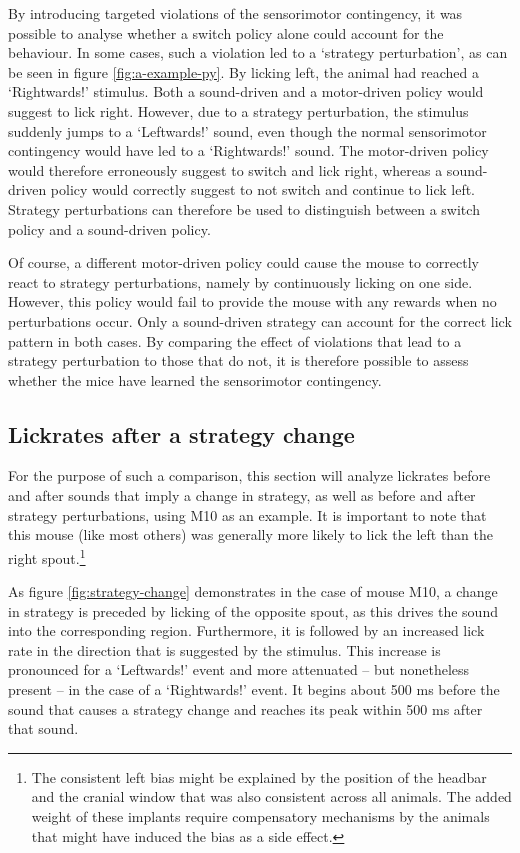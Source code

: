\documentclass[]{report}
\let\rmarkdownfootnote\footnote%
\def\footnote{\protect\rmarkdownfootnote}
\theoremstyle{definition}
\theoremstyle{definition}
\theoremstyle{definition}
\theoremstyle{remark}
\begin{document}
By introducing targeted violations of the sensorimotor contingency, it
was possible to analyse whether a switch policy alone could account for
the behaviour. In some cases, such a violation led to a `strategy
perturbation', as can be seen in figure \ref{fig:a-example-py}. By
licking left, the animal had reached a `Rightwards!' stimulus. Both a
sound-driven and a motor-driven policy would suggest to lick right.
However, due to a strategy perturbation, the stimulus suddenly jumps to
a `Leftwards!' sound, even though the normal sensorimotor contingency
would have led to a `Rightwards!' sound. The motor-driven policy would
therefore erroneously suggest to switch and lick right, whereas a
sound-driven policy would correctly suggest to not switch and continue
to lick left. Strategy perturbations can therefore be used to
distinguish between a switch policy and a sound-driven policy.

Of course, a different motor-driven policy could cause the mouse to
correctly react to strategy perturbations, namely by continuously
licking on one side. However, this policy would fail to provide the
mouse with any rewards when no perturbations occur. Only a sound-driven
strategy can account for the correct lick pattern in both cases. By
comparing the effect of violations that lead to a strategy perturbation
to those that do not, it is therefore possible to assess whether the
mice have learned the sensorimotor contingency.

\hypertarget{lickrates-after-a-strategy-change}{%
\subsection{Lickrates after a strategy
change}\label{lickrates-after-a-strategy-change}}

For the purpose of such a comparison, this section will analyze
lickrates before and after sounds that imply a change in strategy, as
well as before and after strategy perturbations, using M10 as an
example. It is important to note that this mouse (like most others) was
generally more likely to lick the left than the right spout.\footnote{The
  consistent left bias might be explained by the position of the headbar
  and the cranial window that was also consistent across all animals.
  The added weight of these implants require compensatory mechanisms by
  the animals that might have induced the bias as a side effect.}

As figure \ref{fig:strategy-change} demonstrates in the case of mouse
M10, a change in strategy is preceded by licking of the opposite spout,
as this drives the sound into the corresponding region. Furthermore, it
is followed by an increased lick rate in the direction that is suggested
by the stimulus. This increase is pronounced for a `Leftwards!' event
and more attenuated -- but nonetheless present -- in the case of a
`Rightwards!' event. It begins about 500 ms before the sound that causes
a strategy change and reaches its peak within 500 ms after that sound.
\end{document}
